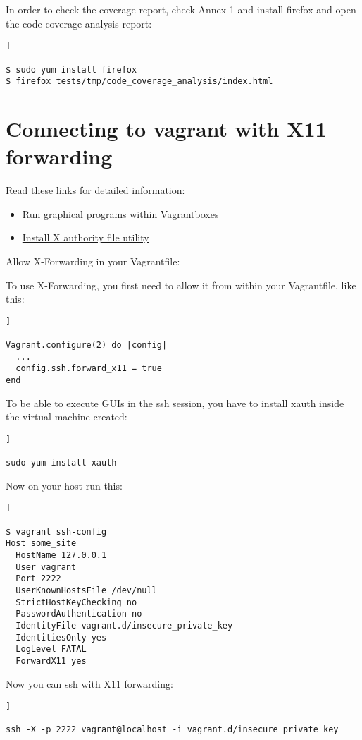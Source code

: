 In order to check the coverage report, check Annex 1 and install firefox and open the code coverage analysis report:

\begin{lstlisting}[breaklines=true, style=bash]]

$ sudo yum install firefox
$ firefox tests/tmp/code_coverage_analysis/index.html

\end{lstlisting}

\section {Connecting to vagrant with X11 forwarding}

Read these links for detailed information:

\begin{itemize}

\item \href{https://coderwall.com/p/ozhfva/run-graphical-programs-within-vagrantboxes}{Run graphical programs within Vagrantboxes} 
\item \href{https://www.cyberciti.biz/faq/how-to-fix-x11-forwarding-request-failed-on-channel-0/}{Install X authority file utility} 

\end{itemize}

Allow X-Forwarding in your Vagrantfile:

To use X-Forwarding, you first need to allow it from within your Vagrantfile, like this:

\begin{lstlisting}[breaklines=true, style=bash]]

Vagrant.configure(2) do |config|
  ...
  config.ssh.forward_x11 = true
end

\end{lstlisting}

To be able to execute GUIs in the ssh session, you have to install xauth inside the virtual machine created:

\begin{lstlisting}[breaklines=true, style=bash]]

sudo yum install xauth

\end{lstlisting}

Now on your host run this:

\begin{lstlisting}[breaklines=true, style=bash]]

$ vagrant ssh-config
Host some_site
  HostName 127.0.0.1
  User vagrant
  Port 2222
  UserKnownHostsFile /dev/null
  StrictHostKeyChecking no
  PasswordAuthentication no
  IdentityFile vagrant.d/insecure_private_key
  IdentitiesOnly yes
  LogLevel FATAL
  ForwardX11 yes

\end{lstlisting}

Now you can ssh with X11 forwarding:

\begin{lstlisting}[breaklines=true, style=bash]]

ssh -X -p 2222 vagrant@localhost -i vagrant.d/insecure_private_key

\end{lstlisting}

